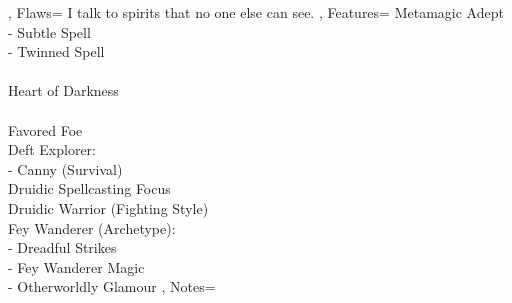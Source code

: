 \documentclass[10pt,a4paper]{scrbook}
\begin{document}
{{		},
		Flaws={
			I talk to spirits that no one else can see.
		},
		Features={
			Metamagic Adept\\
			- Subtle Spell\\
			- Twinned Spell\\
			\\
			Heart of Darkness\\
			\\
			Favored Foe\\ %
			Deft Explorer:\\ %
			- Canny (Survival)\\
			Druidic Spellcasting Focus\\
			Druidic Warrior (Fighting Style)\\
			Fey Wanderer (Archetype):\\
			- Dreadful Strikes\\
			- Fey Wanderer Magic\\
			- Otherworldly Glamour
		},
		Notes={
		}
	}
\end{document}
